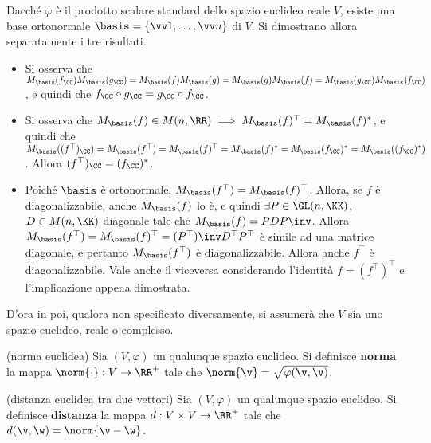 \documentclass[11pt]{article}
\begin{document}
	\begin{solution}
		Dacché $\varphi$ è il prodotto scalare standard dello spazio euclideo reale $V$, esiste una base ortonormale $\basis = \{ \vv 1, \ldots, \vv n\}$ di $V$. Si dimostrano allora separatamente i tre risultati.
		
		\begin{itemize}
			\item Si osserva che $M_\basis(f_\CC) M_\basis(g_\CC) = M_\basis(f) M_\basis(g) =
			M_\basis(g) M_\basis(f) = M_\basis(g_\CC) M_\basis(f_\CC)$, e quindi
			che $f_\CC \circ g_\CC = g_\CC \circ f_\CC$.
			
			\item Si osserva che $M_\basis(f) \in M(n, \RR) \implies M_\basis(f)^\top = M_\basis(f)^*$, e quindi che $M_\basis((f^\top)_\CC) = M_\basis(f^\top) = M_\basis(f)^\top = M_\basis(f)^* = M_\basis(f_\CC)^* = M_\basis((f_\CC)^*)$. Allora
			$(f^\top)_\CC= (f_\CC)^*$.
			
			\item Poiché $\basis$ è ortonormale, $M_\basis(f^\top) = M_\basis(f)^\top$. Allora, se
			$f$ è diagonalizzabile, anche $M_\basis(f)$ lo è, e quindi $\exists P \in \GL(n, \KK)$,
			$D \in M(n, \KK)$ diagonale tale che $M_\basis(f) = P D P\inv$. Allora $M_\basis(f^\top) =
			M_\basis(f)^\top = (P^\top)\inv D^\top P^\top$ è simile ad una matrice diagonale, e
			pertanto $M_\basis(f^\top)$ è diagonalizzabile. Allora anche $f^\top$ è diagonalizzabile.
			Vale anche il viceversa considerando l'identità $f = (f^\top)^\top$ e l'implicazione
			appena dimostrata.
		\end{itemize}
	\end{solution}

	\hr
	
	\begin{note}
		D'ora in poi, qualora non specificato diversamente, si assumerà che $V$ sia uno spazio
		euclideo, reale o complesso.
	\end{note}
	
	\begin{definition} (norma euclidea)
		Sia $(V, \varphi)$ un qualunque spazio euclideo. Si definisce \textbf{norma} la mappa
		$\norm{\cdot} : V \to \RR^+$ tale che $\norm{\v} = \sqrt{\varphi(\v, \v)}$.
	\end{definition}

	\begin{definition} (distanza euclidea tra due vettori)
		Sia $(V, \varphi)$ un qualunque spazio euclideo. Si definisce \textbf{distanza} la mappa
		$d : V \times V \to \RR^+$ tale che $d(\v, \w) = \norm{\v - \w}$.
	\end{definition}
\end{document}
